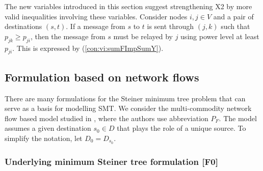 The new variables introduced in this section suggest strengthening X2 by more valid inequalities involving these variables.
Consider nodes $i,j\in V$ and a pair of destinations $(s,t)$.
If a message from $s$ to $t$ is sent through $(j,k)$ such that $p_{jk}\geq p_{ji}$, then the message from $s$ must be relayed by $j$ using power level at least $p_{ji}$.
This is expressed by (\ref{con:vi:sumFImpSumY}).

\subsection{Formulation based on network flows}

There are many formulations for the Steiner minimum tree problem that can serve as a basis for modelling SMT.
We consider the multi-commodity network flow based model studied in \cite{Polzin}, where the authors use abbreviation $P_{F}$.
The model assumes a given destination $s_0\in D$ that plays the role of a unique source.
To simplify the notation, let $D_0= D_{s_0}$.

\subsubsection{Underlying minimum Steiner tree formulation [F0]}

